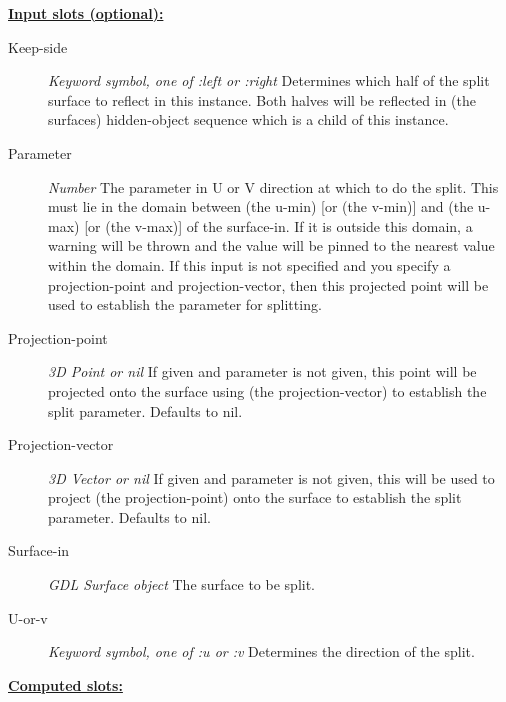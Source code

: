 \documentclass [11pt]{book}
\begin{document}
\begin{itemize}
\begin{figure}
\end{figure}





\textbf{
\underline{Input slots (optional):}}

\begin{description}

\item [Keep-side]
\emph{Keyword symbol, one of :left or :right} Determines which half of the split
surface to reflect in this instance. Both halves will be reflected in (the surfaces)
hidden-object sequence which is a child of this instance.


\item [Parameter]
\emph{Number} The parameter in U or V direction at which to do the split. This must
lie in the domain between (the u-min) [or (the v-min)] and (the u-max) [or (the v-max)]
of the surface-in. If it is outside this domain, a warning will be thrown and the
value will be pinned to the nearest value within the domain.
If this input is not specified and you specify a projection-point and projection-vector,
then this projected point will be used to establish the parameter for splitting.


\item [Projection-point]
\emph{3D Point or nil} If given and parameter is not given,
this point will be projected onto the surface using (the projection-vector)
to establish the split parameter. Defaults to nil.


\item [Projection-vector]
\emph{3D Vector or nil} If given and parameter is not given,
this will be used to project (the projection-point)
onto the surface to establish the split parameter.
Defaults to nil.


\item [Surface-in]
\emph{GDL Surface object} The surface to be split.


\item [U-or-v]
\emph{Keyword symbol, one of :u or :v} Determines the direction of the split.


\end{description}






\textbf{
\underline{Computed slots:}}


\end{itemize}
\end{document}
